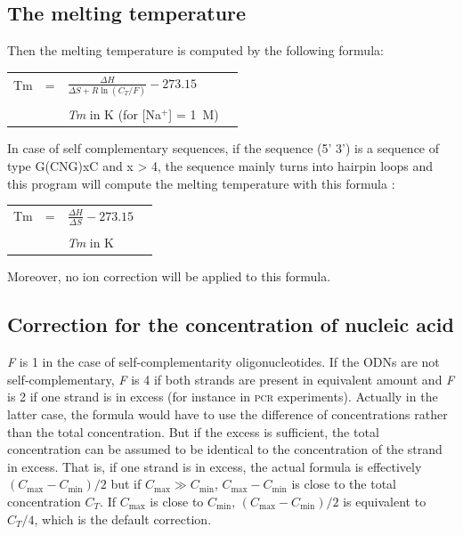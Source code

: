 \documentclass{article}
\begin{document}
\subsection{The melting temperature }  

Then the melting temperature is computed by the following formula: 
 
 

\begin{tabular}[h]{rcp{1.6in}p{2.2in}}
Tm & = & \begin{math} \frac{\Delta{}H}{\Delta{}S + R \ln (C_T/F)} - 273.15 \end{math} \\
   &   &                                                                                                                                                \\
   &   & \footnotesize \textit{Tm} in K (for [Na$^+$] = 1~M)
\end{tabular}



In case of self complementary sequences, if the sequence (5' 3') is a sequence of type G(CNG)xC 
and x > 4, the sequence mainly turns into hairpin loops and this program will compute the melting
temperature with this formula :


   
\begin{tabular}[h]{rcp{1.6in}p{2.2in}}
Tm & = & \begin{math} \frac{\Delta{}H}{\Delta{}S} - 273.15 \end{math} \\
   &   &                                                                                                                                                \\
   &   & \footnotesize \textit{Tm} in K 
\end{tabular}


Moreover, no ion correction will be applied to this formula.

\subsection{Correction for the concentration of nucleic acid }  

\textit{F} is 1 in the case of self-complementarity oligonucleotides. If the
ODNs are not self-complementary, \textit{F} is 4 if both strands are present in
equivalent amount and \textit{F} is 2 if one strand is in excess (for instance
in \textsc{pcr} experiments).  Actually in the latter case, the formula would
have to use the difference of concentrations rather than the total
concentration. But if the excess is sufficient, the total concentration can be
assumed to be identical to the concentration of the strand in excess. That is,
if one strand is in excess, the actual formula is effectively $(C_{\mbox{max}} -
C_{\mbox{min}})/2$ but if $C_{\mbox{max}} \gg C_{\mbox{min}}$, $C_{\mbox{max}}
- C_{\mbox{min}}$ is close to the total concentration $C_T$.  If $C_{\mbox{max}}$ is close
to $C_{\mbox{min}}$, $(C_{\mbox{max}} - C_{\mbox{min}})/2$ is equivalent to $C_T/4$, which is the default
correction.
\end{document}
